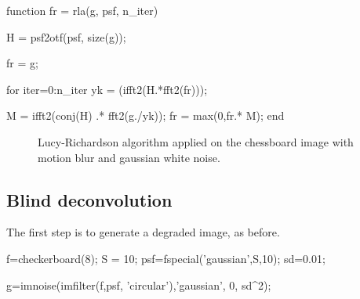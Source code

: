 \begin{matlab}
function fr = rla(g, psf, n_iter)
%

H = psf2otf(psf, size(g));

fr = g;

for iter=0:n_iter
    yk = (ifft2(H.*fft2(fr)));
    
    M = ifft2(conj(H) .* fft2(g./yk));
    fr = max(0,fr.* M);
end
\end{matlab}

\begin{figure}[htbp]
 \centering
 
 \hspace{1cm}
 
 \caption{Lucy-Richardson algorithm applied on the chessboard image with motion blur and gaussian white noise.}
 \label{fig:deblurring:matlab:lucy_motion}
\end{figure}

\newpage
\subsection{Blind deconvolution}
The first step is to generate a degraded image, as before.
\begin{matlab}
f=checkerboard(8);
S = 10; %
psf=fspecial('gaussian',S,10);
sd=0.01; %

g=imnoise(imfilter(f,psf, 'circular'),'gaussian', 0, sd^2);
\end{matlab}

